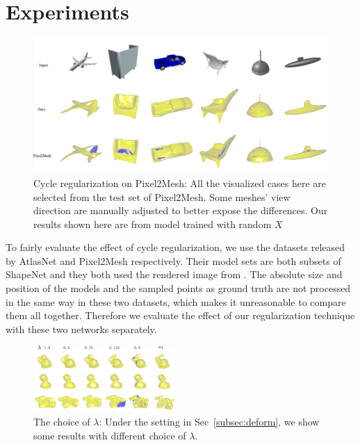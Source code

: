 \section{Experiments}
\begin{figure}[t]
	\centering
	\includegraphics[width=\linewidth]{img/p2m/final}
	\caption{Cycle regularization on Pixel2Mesh: All the visualized cases here are selected from the test set of Pixel2Mesh. Some meshes' view direction are manually adjusted to better expose the differences. Our results shown here are from model trained with random $X$}
	\label{fig:p2m}
\end{figure}
 To fairly evaluate the effect of cycle regularization, we use the datasets released by AtlasNet and Pixel2Mesh respectively. Their model sets are both subsets of ShapeNet \cite{shapenetdata} and they both used the rendered image from \cite{3DR2N2}. The absolute size and position of the models and the sampled points as ground truth are not processed in the same way in these two datasets, which makes it unreasonable to compare them all together. Therefore we evaluate the effect of our regularization technique with these two networks separately.

\begin{figure}
	\begin{center}
		\includegraphics[width=0.48\textwidth]{img/opt/lambda}
	\end{center}
	\caption{The choice of $\lambda$: Under the setting in Sec~\ref{subsec:deform}, we show some results with different choice of $\lambda$.}
	\label{fig:lambda}
\end{figure}

